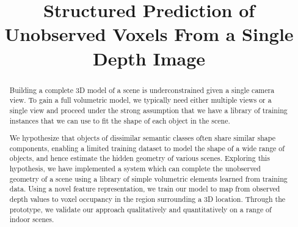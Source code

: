 \documentclass[10pt,twocolumn,letterpaper]{article}
\title{Structured Prediction of Unobserved Voxels From a Single Depth Image}
\begin{document}
\maketitle

\begin{abstract}

  Building a complete 3D model of a scene is underconstrained given a single camera view.
  To gain a full volumetric model, we typically need either multiple views or a single view and proceed under the strong assumption that we have a library of training instances that we can use to fit the shape of each object in the scene.
  
  We hypothesize that objects of dissimilar semantic classes often share similar shape components, enabling a limited  training dataset to model the shape of a wide range of objects, and hence estimate the hidden geometry of various scenes.
  Exploring this hypothesis, we have implemented a system which can complete the unobserved geometry of a scene using a library of simple volumetric elements learned from training data.
  Using a novel feature representation, we train our model to map from observed depth values to voxel occupancy in the region surrounding a 3D location.
  Through the prototype, we validate our approach qualitatively and quantitatively on a range of indoor scenes.




\end{abstract}
\end{document}
